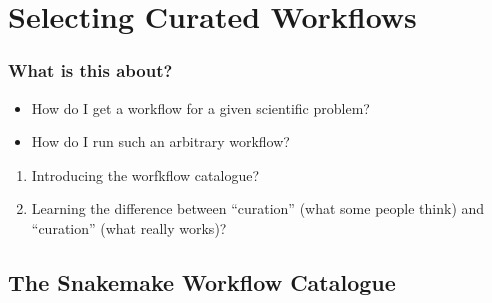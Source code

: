 \section{Selecting Curated Workflows}
{   
}


\begin{frame}
  \frametitle{What is this about?}
   \begin{question}[Questions]
   	 \begin{itemize}
       \item How do I get a workflow for a given scientific problem?
       \item How do I run such an arbitrary workflow?
     \end{itemize}
   \end{question} 
   \begin{docs}[Objectives]
   	  \begin{enumerate}
                      \item Introducing the worfkflow catalogue?
                      \item Learning the difference between ``curation'' (what some people think) and ``curation'' (what really works)?
      \end{enumerate}
    \end{docs}
\end{frame}  

\subsection{The Snakemake Workflow Catalogue}


